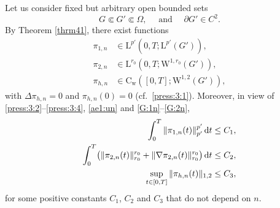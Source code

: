 \documentclass[12pt,reqno]{amsart}
\numberwithin{equation}{section}
\let\originalleft\left
\let\originalright\right
\renewcommand{\left}{\mathopen{}\mathclose\bgroup\originalleft}
\renewcommand{\right}{\aftergroup\egroup\originalright}
\theoremstyle{definition}
\def\dt{\,\mathrm{d}t}
\def\W{\mathrm{W}}
\def\L{\mathrm{L}}
\def\C{\mathrm{C}}
\begin{document}
{Let us consider fixed but arbitrary open bounded sets
\begin{equation*}
G \Subset G' \Subset \Omega, \quad  \text{ and } \quad \partial G' \in C^2.
\end{equation*}
}
By Theorem \ref{thrm41}, {there exist functions}
\begin{align*}
	\pi_{1,n}& \in \L^{p'}(0,T;\L^{p'}(G')),\\
	\pi_{2,n} &\in \L^{r_0}(0,T;\W^{1,r_0}(G')),\\
	\pi_{h,n} &\in \C_{\mathrm{w}}([0,T];\W^{1,2}(G')),
\end{align*}
with $\Delta \pi_{h,n}=0$ and $\pi_{h,n}(0)=0$ {(cf.~\eqref{press:3:1}).
Moreover, in view of \eqref{press:3:2}--\eqref{press:3:4}, \eqref{ae1:un} and \eqref{G:1n}--\eqref{G:2n},}
\begin{align}
\label{5.53}
 \int_0^T\|\pi_{1,n}(t)\|_{p'}^{p'}\dt &\leq C_1, \\
\label{5.54}
  \int_0^T\left(\|\pi_{2,n}(t)\|_{r_0}^{r_0}+\|\nabla\pi_{2,n}(t)\|_{r_0}^{r_0}\right)\dt &\leq C_2 , \\
\nonumber
 \sup_{t\in[0,T]}\|\pi_{h,n}(t)\|_{1,2}& \leq C_3,
\end{align}
for some positive constants $C_1$, $C_2$ and $C_3$ that do not depend on $n$.
\end{document}
